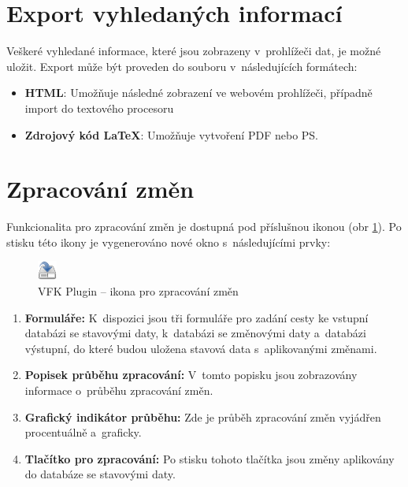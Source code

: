 \documentclass[a4paper,12pt,oneside]{book}
\newcommand{\latex}{\LaTeX}
\begin{document}
\clearpage
\section{Export vyhledaných informací}
Veškeré vyhledané informace, které jsou zobrazeny v~prohlížeči dat, je
možné uložit. Export může být proveden do souboru v~následujících
formátech:

\begin{itemize}
\item \textbf{HTML}: Umožňuje následné zobrazení ve webovém
  prohlížeči, případně import do textového procesoru
 \item \textbf{Zdrojový kód \latex}: Umožňuje vytvoření PDF nebo PS.
\end{itemize}

\section{Zpracování změn}
Funkcionalita pro zpracování změn je dostupná pod příslušnou ikonou
(obr \ref{l_ikona_zmen}). Po stisku této ikony je vygenerováno nové
okno s~následujícími prvky:

\begin{figure}[htb]
\centering
\includegraphics[scale=0.9]{images/applyChanges.png}
\caption[VFK Plugin -- ikona pro zpracování změn]{VFK Plugin -- ikona pro zpracování změn}
\label{l_ikona_zmen}
\end{figure} 

\begin{enumerate} 
\item \textbf{Formuláře:} K~dispozici jsou tři formuláře pro zadání
  cesty ke vstupní databázi se stavovými daty, k~databázi se změnovými
  daty a~databázi výstupní, do které budou uložena stavová data
  s~aplikovanými změnami.
 
\item \textbf{Popisek průběhu zpracování:} V~tomto popisku jsou
  zobrazovány informace o~průběhu zpracování změn.
 
\item \textbf{Grafický indikátor průběhu:} Zde je průběh zpracování
  změn vyjádřen procentuálně a~graficky.
 
\item \textbf{Tlačítko pro zpracování:} Po stisku tohoto tlačítka jsou
  změny aplikovány do databáze se stavovými daty.
 
\end{enumerate}
\end{document}
